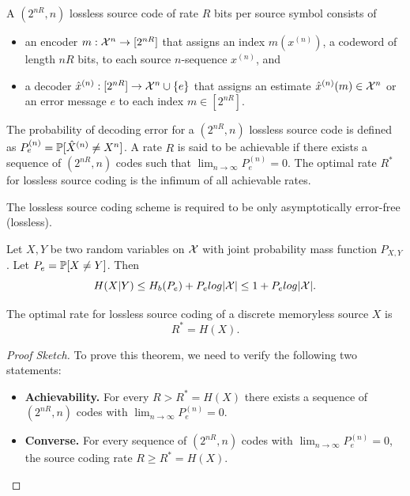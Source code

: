 \documentclass[11pt,a4paper]{article}
\begin{document}
\begin{definition}
    A $(2^{nR},n)$ lossless source code of rate $R$ bits per source symbol consists of 
    \begin{itemize}
        \item an encoder $m:\mathcal{X}^n\rightarrow [2^{nR}]$ that assigns an index $m(x^{(n)})$, a codeword of length $nR$ bits, to each source $n$-sequence $x^{(n)}$, and
        \item a decoder $\hat{x}^{(n)}:[2^{nR}]\rightarrow \mathcal{X}^{n}\cup \{e\}$ that assigns an estimate $\hat{x}^{(n)}(m)\in\mathcal{X}^n$ or an error message $e$ to each index $m\in[2^{nR}]$.
    \end{itemize}
\end{definition}

\begin{definition}
    The probability of decoding error for a $(2^{nR}, n)$ lossless source code is defined as $P^{(n)}_e = \mathbb{P}[\hat{X}^{(n)}\neq X^n]$. A rate $R$ is said to be achievable if there exists a sequence of $(2^{nR}, n)$ codes such that $\lim_{n\rightarrow \infty} P_e^{(n)} = 0$. The optimal rate $R^*$ for lossless source coding is the infimum of all achievable rates.
\end{definition}

\begin{remark}
    The lossless source coding scheme is required to be only asymptotically error-free (lossless).
\end{remark}

\begin{theorem}
    Let $X, Y$ be two random variables on $\mathcal{X}$ with joint probability mass function $P_{X,Y}$. Let $P_e = \mathbb{P}[X \neq Y]$. Then 
    \begin{equation*}
        H(X|Y) \le H_b(P_e) + P_e log|\mathcal{X}| \le 1 + P_e log|\mathcal{X}|. 
    \end{equation*}
\end{theorem}



\begin{theorem} 
    The optimal rate for lossless source coding of a discrete memoryless source $X$ is 
    \begin{equation*}
        R^* = H(X).
    \end{equation*}
\end{theorem}

\begin{proof}[Proof Sketch]\renewcommand{\qedsymbol}{}
    To prove this theorem, we need to verify the following two statements:
    \begin{itemize}
        \item \textbf{Achievability.} For every $R > R^* = H(X)$ there exists a sequence of $(2^{nR}, n)$ codes with $\lim_{n\rightarrow \infty} P_e^{(n)} = 0$.
        \item \textbf{Converse.} For every sequence of $(2^{nR}, n)$ codes with $\lim_{n\rightarrow \infty} P_e^{(n)} = 0$, the source coding rate $R \ge R^* = H(X)$.
    \end{itemize}
\end{proof}
\end{document}
